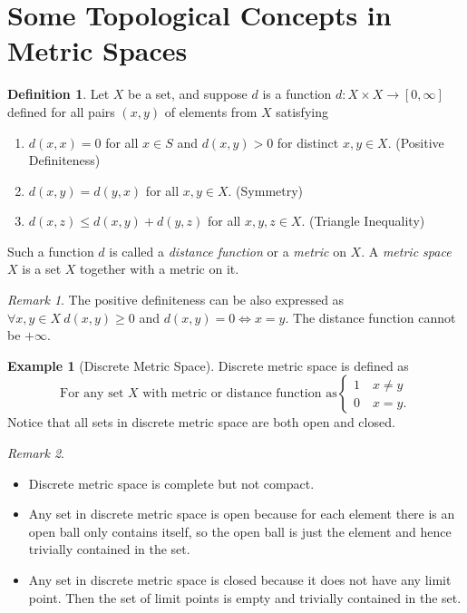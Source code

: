 \documentclass[12pt, lettersize]{book}
\theoremstyle{plain}
\theoremstyle{definition}
\newtheorem{dfn}[thm]{Definition}
\newtheorem*{eg}{Example}
\theoremstyle{remark}
\newtheorem*{rem}{Remark}
\begin{document}
	\section{Some Topological Concepts in Metric Spaces}
	\begin{dfn}
		Let $X$ be a set, and suppose $d$ is a function $d: X\times X\rightarrow[0,\infty]$ defined for all pairs $(x,y)$ of elements from $X$ satisfying
		\begin{enumerate}
			\item $d(x,x)=0$ for all $x\in S$ and $d(x,y)>0$ for distinct $x,y\in X$. (Positive Definiteness)
			\item $d(x,y)=d(y,x)$ for all $x,y\in X$. (Symmetry)
			\item $d(x,z)\leq d(x,y)+d(y,z)$ for all $x,y,z\in X$. (Triangle Inequality)
		\end{enumerate}
		Such a function $d$ is called a \emph{distance function} or a \emph{metric} on $X$. A \emph{metric space} $X$ is a set $X$ together with a metric on it.
	\end{dfn}
	\begin{rem}
		The positive definiteness can be also expressed as $\forall x,y\in X\ d(x,y)\geq 0$ and $d(x,y)=0\iff x=y$. The distance function cannot be $+\infty$.
	\end{rem}
	\begin{eg}[Discrete Metric Space]
		Discrete metric space is defined as
		\begin{displaymath}
			\text{For any set $X$ with metric or distance function as}\begin{cases}
				1\quad\text{$x\neq y$}\\ 0\quad\text{$x=y$}.
			\end{cases}
		\end{displaymath}
		Notice that all sets in discrete metric space are both open and closed.
	\end{eg}
	\begin{rem}
		\begin{itemize}
			\item Discrete metric space is complete but not compact.
			\item Any set in discrete metric space is open because for each element there is an open ball only contains itself, so the open ball is just the element and hence trivially contained in the set.
			\item Any set in discrete metric space is closed because it does not have any limit point. Then the set of limit points is empty and trivially contained in the set.
		\end{itemize}
	\end{rem}
	
\end{document}
